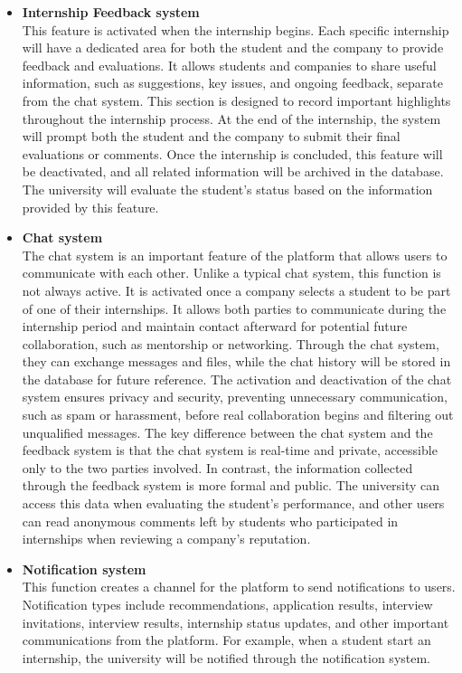 \begin{itemize}[label={ }]
    \item \textcolor{bluepoli}{\textbf{Internship Feedback system}}
    \\This feature is activated when the internship begins. Each specific internship will have a dedicated area for both the student and the company to
    provide feedback and evaluations.
    It allows students and companies to share useful information, such as suggestions, key issues, and ongoing feedback, separate from the chat system. 
    This section is designed to record important highlights throughout the internship process. At the end of the internship, the system will prompt both 
    the student and the company to submit their final evaluations or comments. Once the internship is concluded, this feature will be deactivated, and 
    all related information will be archived in the database. The university will evaluate the student's status based on the information provided by this
    feature.
    \item \textcolor{bluepoli}{\textbf{Chat system}}
    \\The chat system is an important feature of the platform that allows users to communicate with each other. Unlike a typical chat system, this function
    is not always active. It is activated once a company selects a student to be part of one of their internships. 
    It allows both parties to communicate during the internship period and maintain contact afterward for potential future collaboration, such as mentorship 
    or networking. Through the chat system, they can exchange messages and files, while the chat history will be stored in the database for future reference.
    The activation and deactivation of the chat system ensures privacy and security, preventing unnecessary communication, such as spam or harassment, 
    before real collaboration begins and filtering out unqualified messages.
    The key difference between the chat system and the feedback system is that the chat system is real-time and private, accessible only to the two parties 
    involved. In contrast, the information collected through the feedback system is more formal and public. The university can access this data when evaluating
    the student's performance, and other users can read anonymous comments left by students who participated in internships when reviewing a company's reputation.

    \item \textcolor{bluepoli}{\textbf{Notification system}}
    \\This function creates a channel for the platform to send notifications to users. Notification types include recommendations, application results,
    interview invitations, interview results, internship status updates, and other important communications from the platform. For example, when a student
    start an internship, the university will be notified through the notification system.


\end{itemize}

